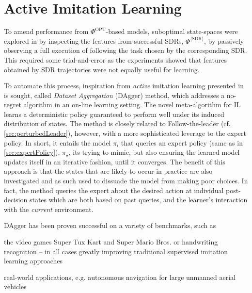 \documentclass[smallextended]{svjour3}
\begin{document}
\section{Active Imitation Learning}\label{sec:il:active}

To amend performance from $\Phi^{\text{OPT}}$-based models, suboptimal 
state-spaces were explored in \cite{InRu15a} by inspecting the features from 
successful SDRs, $\Phi^{\langle\text{SDR}\rangle}$, by passively observing a 
full execution of following the task chosen by the corresponding SDR. 
This required some trial-and-error as the experiments showed that features 
obtained by SDR trajectories were not equally useful for learning.

To automate this process, inspiration from \emph{active} imitation learning 
presented in \cite{RossGB11} is sought, called \emph{Dataset Aggregation} 
(DAgger) method, which addresses a no-regret algorithm in an on-line learning 
setting. 
The novel meta-algorithm for IL learns a deterministic policy guaranteed to 
perform well under its induced distribution of states. 
The method is closely related to Follow-the-leader (cf. 
\cref{sec:perturbedLeader}), however, with a more sophisticated leverage to the 
expert policy. 
In short, it entails the model $\pi_i$ that queries an expert policy (same as 
in \cref{sec:expertPolicy}), $\pi_\star$, its trying to mimic, 
but also ensuring the learned model updates itself in an iterative fashion, 
until it converges. 
The benefit of this approach is that the states that are likely to occur in 
practice are also investigated and as such used to dissuade the model from 
making poor choices. In fact, the method queries the expert about the desired 
action at individual post-decision states which are both based on past queries, 
and the learner's interaction with the \emph{current} environment.

DAgger has been proven successful on a variety of benchmarks, such as
\begin{enumerate*}[label={{}}]
  \item the video games Super Tux Kart and Super Mario Bros. or
  handwriting recognition -- in all cases greatly improving traditional 
  supervised imitation learning approaches \cite{RossGB11}
  \item real-world applications, e.g. autonomous navigation for large unmanned 
  aerial vehicles \cite{Ross13}
\end{enumerate*}
\end{document}
